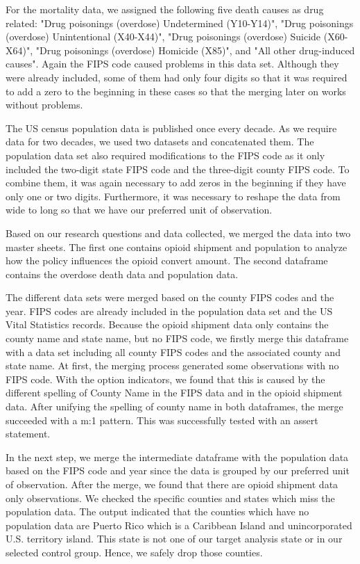 \documentclass[12pt,letterpaper]{article}
\begin{document}
For the mortality data, we assigned the following five death causes as drug related: "Drug poisonings (overdose) Undetermined (Y10-Y14)", "Drug poisonings (overdose) Unintentional (X40-X44)", "Drug poisonings (overdose) Suicide (X60-X64)", "Drug poisonings (overdose) Homicide (X85)", and "All other drug-induced causes". Again the FIPS code caused problems in this data set. Although they were already included, some of them had only four digits so that it was required to add a zero to the beginning in these cases so that the merging later on works without problems.

The US census population data is published once every decade. As we require data for two decades, we used two datasets and concatenated them. The population data set also required modifications to the FIPS code as it only included the two-digit state FIPS code and the three-digit county FIPS code. To combine them, it was again necessary to add zeros in the beginning if they have only one or two digits. Furthermore, it was necessary to reshape the data from wide to long so that we have our preferred unit of observation.

Based on our research questions and data collected, we merged the data into two master sheets. The first one contains opioid shipment and population to analyze how the policy influences the opioid convert amount. The second dataframe contains the overdose death data and population data. 

The different data sets were merged based on the county FIPS codes and the year. FIPS codes are already included in the population data set and the US Vital Statistics records. Because the opioid shipment data only contains the county name and state name, but no FIPS code, we firstly merge this dataframe with a data set including all county FIPS codes and the associated county and state name. At first, the merging process generated some observations with no FIPS code. With the option indicators, we found that this is caused by the different spelling of County Name in the FIPS data and in the opioid shipment data. After unifying the spelling of county name in both dataframes, the merge succeeded with a m:1 pattern. This was successfully tested with an assert statement.

In the next step, we merge the intermediate dataframe with the population data based on the FIPS code and year since the data is grouped by our preferred unit of observation. After the merge, we found that there are opioid shipment data only observations. We checked the specific counties and states which miss the population data. The output indicated that the counties which have no population data are Puerto Rico which is a Caribbean Island and unincorporated U.S. territory island. This state is not one of our target analysis state or in our selected control group. Hence, we safely drop those counties.
\end{document}
